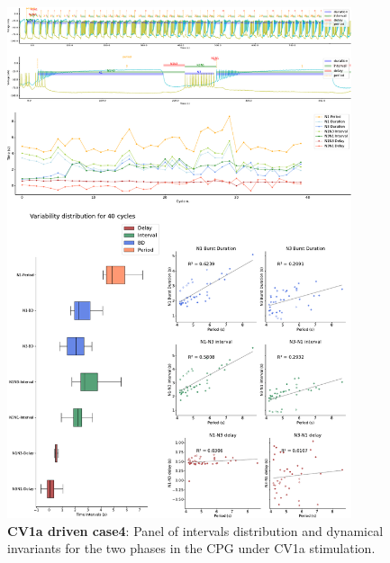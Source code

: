 %

\begin{figure}[htbp]
	\centering
	\includegraphics[width=0.9\textwidth]{./invariants/data/SUSSEX/CV1a_driven4/images/2phases/panel_with_intervals.pdf}
	\caption{\textbf{CV1a driven case4}: Panel of intervals distribution and dynamical invariants for the two phases in the CPG under CV1a stimulation.}
	\label{fig:cv1a 4 2phases}
\end{figure}

